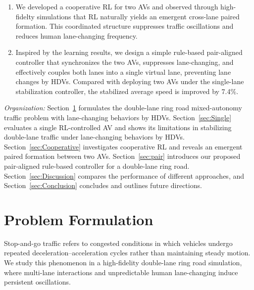 \documentclass{ifacconf}
\newcommand{\1}{\mbox{1}\hspace{-0.25em}\mbox{l}}
\begin{document}
\begin{enumerate}

  
    \item We developed a cooperative RL for two AVs and observed through high-fidelty simulations that RL naturally yields an emergent cross-lane paired formation. This coordinated structure suppresses traffic oscillations and reduces human lane-changing frequency.

\item Inspired by the learning results, we design a simple rule-based pair-aligned controller that synchronizes the two AVs, suppresses lane-changing, and effectively couples both lanes into a single virtual lane, preventing lane changes by HDVs. Compared with deploying two AVs under the single-lane stabilization controller, the stabilized average speed is improved by 7.4\%.


\end{enumerate}

{\it Organization:} Section~\ref{PDSGO} formulates the double-lane ring road mixed-autonomy traffic problem with lane-changing behaviors by HDVs. Section~\ref{sec:Single} evaluates a single RL-controlled AV and shows its limitations in stabilizing double-lane traffic under lane-changing behaviors by HDVs. Section~\ref{sec:Cooperative} investigates cooperative RL and reveals an emergent paired formation between two AVs. Section~\ref{sec:pair} introduces our proposed pair-aligned rule-based controller for a double-lane ring road. Section~\ref{sec:Discussion} compares the performance of different approaches, and Section~\ref{sec:Conclusion} concludes and outlines future directions.



\section{Problem Formulation}\label{PDSGO}

Stop-and-go traffic refers to congested conditions in which vehicles undergo repeated deceleration–acceleration cycles rather than maintaining steady motion. We study this phenomenon in a high-fidelity double-lane ring road simulation, where multi-lane interactions and unpredictable human lane-changing induce persistent oscillations.
\end{document}
